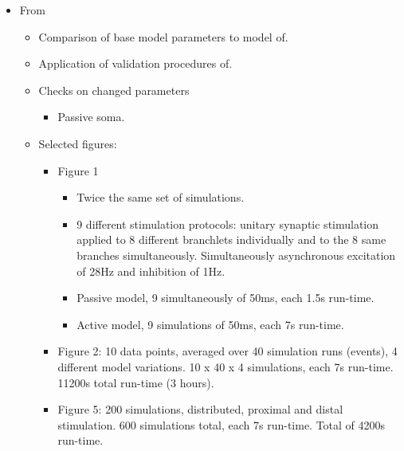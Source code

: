 \documentclass[12pt]{article}
\begin{document}
\begin{itemize}
\item From~\cite{schutter94:_simul_purkin}

  \begin{itemize}
  \item Comparison of base model parameters to model of\cite{E:1994hc}.
  \item Application of validation procedures of\cite{De-Schutter-E:1994vn}.
  \item Checks on changed parameters
    \begin{itemize}
    \item Passive soma.
    \end{itemize}
  \item Selected figures:
    \begin{itemize}
    \item Figure 1
      \begin{itemize}
      \item Twice the same set of simulations.
      \item 9 different stimulation protocols: unitary synaptic
        stimulation applied to 8 different branchlets individually and
        to the 8 same branches simultaneously.  Simultaneously
        asynchronous excitation of 28Hz and inhibition of 1Hz.
      \item Passive model, 9 simultaneously of 50ms, each 1.5s
        run-time.
      \item Active model, 9 simulations of 50ms, each 7s run-time.
      \end{itemize}
    \item Figure 2: 10 data points, averaged over 40 simulation runs
      (events), 4 different model variations.  10 x 40 x 4
      simulations, each 7s run-time.  11200s total run-time (3 hours).
    \item Figure 5: 200 simulations, distributed, proximal and distal
      stimulation.  600 simulations total, each 7s run-time.  Total of
      4200s run-time.
    \end{itemize}
  \end{itemize}
\end{itemize}




\end{document}
